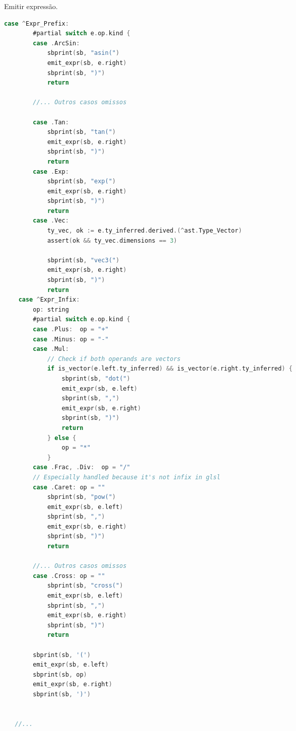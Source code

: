 \begin{codigo}[H]
   \caption{\small Emitir expressão. }
   \label{cod-emit-expr}
\begin{lstlisting}[language=C, basicstyle=\ttfamily\footnotesize, frame=none, inputencoding=utf8]
    case ^Expr_Prefix:
        #partial switch e.op.kind {
        case .ArcSin:
            sbprint(sb, "asin(")
            emit_expr(sb, e.right)
            sbprint(sb, ")")
            return

        //... Outros casos omissos

        case .Tan:
            sbprint(sb, "tan(")
            emit_expr(sb, e.right)
            sbprint(sb, ")")
            return
        case .Exp:
            sbprint(sb, "exp(")
            emit_expr(sb, e.right)
            sbprint(sb, ")")
            return
        case .Vec:
            ty_vec, ok := e.ty_inferred.derived.(^ast.Type_Vector)
            assert(ok && ty_vec.dimensions == 3)

            sbprint(sb, "vec3(")
            emit_expr(sb, e.right)
            sbprint(sb, ")")
            return
    case ^Expr_Infix:
        op: string
        #partial switch e.op.kind {
        case .Plus:  op = "+"
        case .Minus: op = "-"
        case .Mul:
            // Check if both operands are vectors
            if is_vector(e.left.ty_inferred) && is_vector(e.right.ty_inferred) {
                sbprint(sb, "dot(")
                emit_expr(sb, e.left)
                sbprint(sb, ",")
                emit_expr(sb, e.right)
                sbprint(sb, ")")
                return
            } else {
                op = "*"
            }
        case .Frac, .Div:  op = "/"
        // Especially handled because it's not infix in glsl
        case .Caret: op = ""
            sbprint(sb, "pow(")
            emit_expr(sb, e.left)
            sbprint(sb, ",")
            emit_expr(sb, e.right)
            sbprint(sb, ")")
            return

        //... Outros casos omissos
        case .Cross: op = ""
            sbprint(sb, "cross(")
            emit_expr(sb, e.left)
            sbprint(sb, ",")
            emit_expr(sb, e.right)
            sbprint(sb, ")")
            return

        sbprint(sb, '(')
        emit_expr(sb, e.left)
        sbprint(sb, op)
        emit_expr(sb, e.right)
        sbprint(sb, ')')


   //... 

\end{lstlisting}
\end{codigo}

